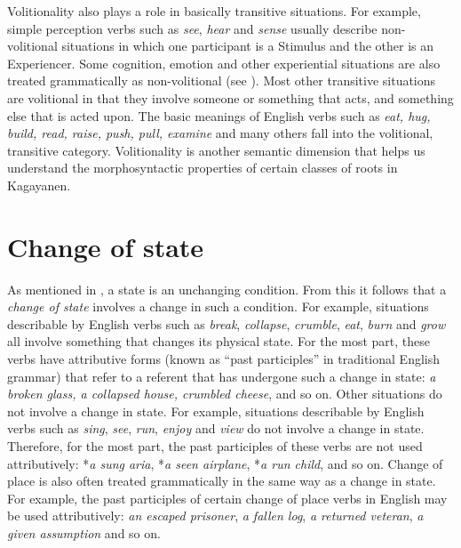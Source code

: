 Volitionality also plays a role in basically transitive situations. For example, simple perception verbs such as \textit{see}, \textit{hear} and \textit{sense} usually describe non-volitio\-nal situations in which one participant is a Stimulus and the other is an Experiencer. Some cognition, emotion and other experiential situations are also treated grammatically as non-volitional (see ). Most other transitive situations are volitional in that they involve someone or something that acts, and something else that is acted upon. The basic meanings of English verbs such as \textit{eat, hug, build, read, raise, push, pull, examine} and many others fall into the volitional, transitive category. Volitionality is another semantic dimension that helps us understand the morphosyntactic properties of certain classes of roots in Kagayanen.

\section{Change of state}
\label{sec:changeofstate}
As mentioned in , a state is an unchanging condition. From this it follows that a \textit{change of state} involves a change in such a condition. For example, situations describable by English verbs such as \textit{break}, \textit{collapse}, \textit{crumble}, \textit{eat}, \textit{burn} and \textit{grow} all involve something that changes its physical state. For the most part, these verbs have attributive forms (known as “past participles” in traditional English grammar) that refer to a referent that has undergone such a change in state: \textit{a broken glass, a collapsed house, crumbled cheese}, and so on. Other situations do not involve a change in state. For example, situations describable by English verbs such as \textit{sing}, \textit{see}, \textit{run}, \textit{enjoy} and \textit{view} do not involve a change in state. Therefore, for the most part, the past participles of these verbs are not used attributively: *\textit{a sung aria}, *\textit{a seen airplane}, *\textit{a run child}, and so on. Change of place is also often treated grammatically in the same way as a change in state. For example, the past participles of certain change of place verbs in English may be used attributively: \textit{an escaped prisoner}, \textit{a fallen log}, \textit{a returned veteran}, \textit{a given assumption} and so on.


